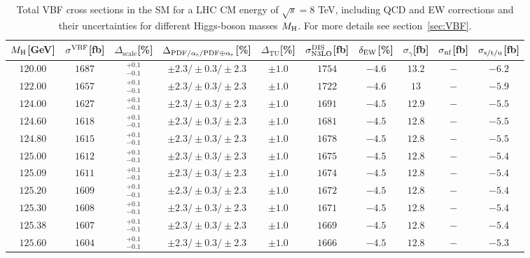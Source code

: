 \begin{table}[ht!]
\caption{Total VBF cross sections in the SM for a LHC CM energy of $\sqrt{s}=8$ TeV, including QCD and EW corrections
and their uncertainties for different Higgs-boson masses $M_\mathrm{H}$. For more details see section~\ref{sec:VBF}.}
\label{tab:vbf_XStot_8}
\begin{center}%
\begin{small}%
\begin{tabular}{cccccccc|cc}%
\toprule
$M_\mathrm{H}$[GeV] & $\sigma^{\mathrm{VBF}}$[fb] & $\Delta_{\mathrm{scale}}$[\%] & $\Delta_{\mathrm{PDF}/\alpha_{\mathrm{s}}/\mathrm{PDF\oplus\alpha_{\mathrm{s}}}}$[\%] & $\Delta_{\mathrm{TU}}$[\%] &
$\sigma_{\mathrm{N3LO}}^{\mathrm{DIS}}$[fb] & $\delta_{\mathrm{EW}}$[\%] & $\sigma_{\gamma}$[fb] & $\sigma_{\mbox{\scriptsize nf}}$[fb] & $\sigma_{\mbox{\scriptsize s/t/u}}$[fb]
\\
\midrule
$120.00$ & $1687$ & $^{+0.1}_{-0.1}$ & $\pm 2.3/\pm 0.3/\pm 2.3$ & $\pm 1.0$ & $1754$ & $-4.6$ & $13.2$ & $-$ & $-6.2$ \\
$122.00$ & $1657$ & $^{+0.1}_{-0.1}$ & $\pm 2.3/\pm 0.3/\pm 2.3$ & $\pm 1.0$ & $1722$ & $-4.6$ & $13  $ & $-$ & $-5.9$ \\
$124.00$ & $1627$ & $^{+0.1}_{-0.1}$ & $\pm 2.3/\pm 0.3/\pm 2.3$ & $\pm 1.0$ & $1691$ & $-4.5$ & $12.9$ & $-$ & $-5.5$ \\
$124.60$ & $1618$ & $^{+0.1}_{-0.1}$ & $\pm 2.3/\pm 0.3/\pm 2.3$ & $\pm 1.0$ & $1681$ & $-4.5$ & $12.8$ & $-$ & $-5.5$ \\
$124.80$ & $1615$ & $^{+0.1}_{-0.1}$ & $\pm 2.3/\pm 0.3/\pm 2.3$ & $\pm 1.0$ & $1678$ & $-4.5$ & $12.8$ & $-$ & $-5.5$ \\
$125.00$ & $1612$ & $^{+0.1}_{-0.1}$ & $\pm 2.3/\pm 0.3/\pm 2.3$ & $\pm 1.0$ & $1675$ & $-4.5$ & $12.8$ & $-$ & $-5.4$ \\
$125.09$ & $1611$ & $^{+0.1}_{-0.1}$ & $\pm 2.3/\pm 0.3/\pm 2.3$ & $\pm 1.0$ & $1674$ & $-4.5$ & $12.8$ & $-$ & $-5.4$ \\
$125.20$ & $1609$ & $^{+0.1}_{-0.1}$ & $\pm 2.3/\pm 0.3/\pm 2.3$ & $\pm 1.0$ & $1672$ & $-4.5$ & $12.8$ & $-$ & $-5.4$ \\
$125.30$ & $1608$ & $^{+0.1}_{-0.1}$ & $\pm 2.3/\pm 0.3/\pm 2.3$ & $\pm 1.0$ & $1671$ & $-4.5$ & $12.8$ & $-$ & $-5.4$ \\
$125.38$ & $1607$ & $^{+0.1}_{-0.1}$ & $\pm 2.3/\pm 0.3/\pm 2.3$ & $\pm 1.0$ & $1669$ & $-4.5$ & $12.8$ & $-$ & $-5.4$ \\
$125.60$ & $1604$ & $^{+0.1}_{-0.1}$ & $\pm 2.3/\pm 0.3/\pm 2.3$ & $\pm 1.0$ & $1666$ & $-4.5$ & $12.8$ & $-$ & $-5.3$ \\

\end{tabular}
\end{small}
\end{center}
\end{table}
